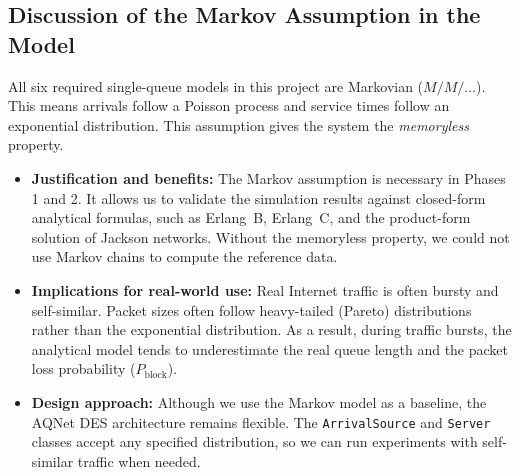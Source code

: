 \subsection{Discussion of the Markov Assumption in the Model}
\noindent All six required single-queue models in this project are Markovian
($M/M/\dots$). This means arrivals follow a Poisson process and service
times follow an exponential distribution. This assumption gives the system
the \emph{memoryless} property.

\begin{itemize}
  \item \textbf{Justification and benefits:} The Markov assumption is
  necessary in Phases 1 and 2. It allows us to validate the simulation
  results against closed-form analytical formulas, such as Erlang~B,
  Erlang~C, and the product-form solution of Jackson networks. Without the
  memoryless property, we could not use Markov chains to compute the
  reference data.

  \item \textbf{Implications for real-world use:} Real Internet traffic is
  often bursty and self-similar. Packet sizes often follow heavy-tailed
  (Pareto) distributions rather than the exponential distribution. As a
  result, during traffic bursts, the analytical model tends to underestimate
  the real queue length and the packet loss probability
  ($P_{\text{block}}$).

  \item \textbf{Design approach:} Although we use the Markov model as a
  baseline, the AQNet DES architecture remains flexible. The
  \texttt{ArrivalSource} and \texttt{Server} classes accept any specified
  distribution, so we can run experiments with self-similar traffic when
  needed.
\end{itemize}
